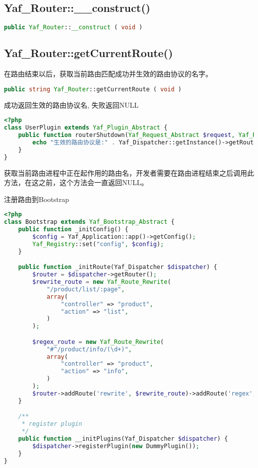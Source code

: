 \subsection{Yaf\_Router::\_\_construct()}



\begin{lstlisting}[language=PHP]
public Yaf_Router::__construct ( void )
\end{lstlisting}


\subsection{Yaf\_Router::getCurrentRoute()}

在路由结束以后，获取当前路由匹配成功并生效的路由协议的名字。


\begin{lstlisting}[language=PHP]
public string Yaf_Router::getCurrentRoute ( void )
\end{lstlisting}

成功返回生效的路由协议名, 失败返回NULL

\begin{lstlisting}[language=PHP]
<?php
class UserPlugin extends Yaf_Plugin_Abstract {
    public function routerShutdown(Yaf_Request_Abstract $request, Yaf_Response_Abstract $response) {
        echo "生效的路由协议是:" . Yaf_Dispatcher::getInstance()->getRouter()->getCurrentRoute();
    }
}
\end{lstlisting}

获取当前路由进程中正在起作用的路由名，开发者需要在路由进程结束之后调用此方法，在这之前，这个方法会一直返回NULL。

\begin{example}
注册路由到Bootstrap
\begin{lstlisting}[language=PHP]
<?php
class Bootstrap extends Yaf_Bootstrap_Abstract {
    public function _initConfig() {
        $config = Yaf_Application::app()->getConfig();
        Yaf_Registry::set("config", $config);
    }

    public function _initRoute(Yaf_Dispatcher $dispatcher) {
        $router = $dispatcher->getRouter();
        $rewrite_route = new Yaf_Route_Rewrite(
            "/product/list/:page",
            array(
                "controller" => "product",
                "action" => "list",
            )
        );

        $regex_route = new Yaf_Route_Rewrite(
            "#^/product/info/(\d+)",
            array(
                "controller" => "product",
                "action" => "info",
            )
        );
        $router->addRoute('rewrite', $rewrite_route)->addRoute('regex', $regex_route);
    }

    /**
     * register plugin
     */
    public function __initPlugins(Yaf_Dispatcher $dispatcher) {
        $dispatcher->registerPlugin(new DummyPlugin());
    }
}
\end{lstlisting}
\end{example}


